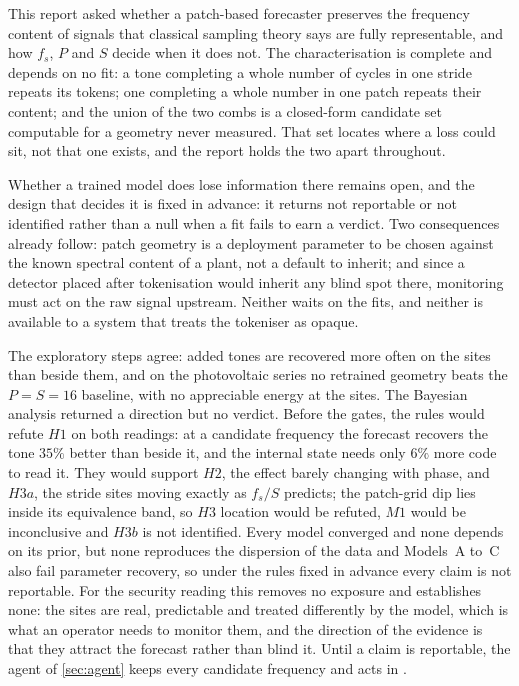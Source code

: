This report asked whether a patch-based forecaster preserves the frequency content of signals that classical sampling theory says are fully representable, and how $f_s$, $P$ and $S$ decide when it does not. The characterisation is complete and depends on no fit: a tone completing a whole number of cycles in one stride repeats its tokens; one completing a whole number in one patch repeats their content; and the union of the two combs is a closed-form candidate set computable for a geometry never measured. That set locates where a loss could sit, not that one exists, and the report holds the two apart throughout.

Whether a trained model does lose information there remains open, and the design that decides it is fixed in advance: it returns not reportable or not identified rather than a null when a fit fails to earn a verdict. Two consequences already follow: patch geometry is a deployment parameter to be chosen against the known spectral content of a plant, not a default to inherit; and since a detector placed after tokenisation would inherit any blind spot there, monitoring must act on the raw signal upstream. Neither waits on the fits, and neither is available to a system that treats the tokeniser as opaque.

The exploratory steps agree: added tones are recovered more often on the sites than beside them, and on the photovoltaic series no retrained geometry beats the $P=S=16$ baseline, with no appreciable energy at the sites. The Bayesian analysis returned a direction but no verdict. Before the gates, the rules would refute $H1$ on both readings: at a candidate frequency the forecast recovers the tone $35\%$ better than beside it, and the internal state needs only $6\%$ more code to read it. They would support $H2$, the effect barely changing with phase, and $H3a$, the stride sites moving exactly as $f_s/S$ predicts; the patch-grid dip lies inside its equivalence band, so $H3$ location would be refuted, $M1$ would be inconclusive and $H3b$ is not identified. Every model converged and none depends on its prior, but none reproduces the dispersion of the data and Models~A to~C also fail parameter recovery, so under the rules fixed in advance every claim is not reportable. For the security reading this removes no exposure and establishes none: the sites are real, predictable and treated differently by the model, which is what an operator needs to monitor them, and the direction of the evidence is that they attract the forecast rather than blind it. Until a claim is reportable, the agent of \autoref{sec:agent} keeps every candidate frequency  and acts in .

